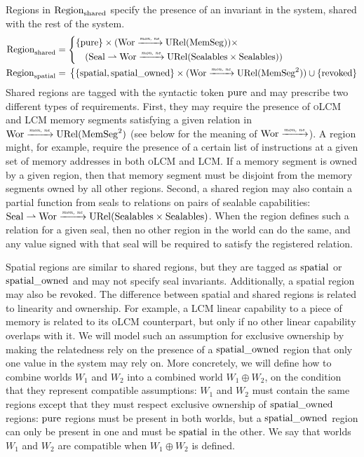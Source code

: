 \documentclass[acmsmall,review,showframe]{acmart}\settopmatter{printfolios=true,printccs=false,printacmref=false}
\renewcommand{\MemSeg}{\shareddom{MemSeg}}
\renewcommand{\SealableCaps}{\shareddom{Sealables}}
\newcommand{\trgcm}{\textsc{LCM}}
\newcommand{\srccm}{\textsc{oLCM}}
\begin{document}
Regions in $\mathrm{Region}_\mathrm{shared}$ specify the presence of an invariant in the system, shared with the rest of the system.
\begin{align*}
  \Regionh &= 
             \left\{\begin{multlined}
               \{\pure \} \times (\Wor \monnefun \URel{\MemSeg}) \times \\
               (\Seal \parfun \Wor \monnefun \URel{\SealableCaps \times \SealableCaps})
             \end{multlined}\right.\\
  \Regions &={}
             \left\{\begin{multlined}
               \{\spatial,\spatialo \} \times (\Wor \monnefun \URel{\MemSeg^2}) \cup{} \{\revoked\}
             \end{multlined}\right.
\end{align*}
Shared regions are tagged with the syntactic token $\mathrm{pure}$ and may prescribe two different types of requirements.
First, they may require the presence of \srccm{} and \trgcm{} memory segments
satisfying a given relation in $\Wor \monnefun \URel{\MemSeg^2}$
(see below for the meaning of $\mathrm{Wor} \xrightarrow{\textit{\tiny{mon, ne}}}$).
A region might, for example, require the presence of a certain list of instructions at a given set of memory addresses in both \srccm{} and \trgcm{}.
If a memory segment is owned by a given region, then that memory segment must be disjoint from the memory segments owned by all other regions.
Second, a shared region may also contain a partial function from seals to relations on pairs of sealable capabilities: $\Seal \parfun \Wor \monnefun \URel{\SealableCaps \times \SealableCaps}$.
When the region defines such a relation for a given seal, then no other region in the world can do the same, and any value signed with that seal will be required to satisfy the registered relation.

Spatial regions are similar to shared regions, but they are tagged as $\mathrm{spatial}$ or $\mathrm{spatial\_owned}$ and may not specify seal invariants.
Additionally, a spatial region may also be $\mathrm{revoked}$.
The difference between spatial and shared regions is related to linearity and ownership.
For example, a \trgcm{} linear capability to a piece of memory is related to its \srccm{} counterpart, but only if no other linear capability overlaps with it.
We will model such an assumption for exclusive ownership by making the relatedness rely on the presence of a $\mathrm{spatial\_owned}$ region that only one value in the system may rely on.
More concretely, we will define how to combine worlds $W_1$ and $W_2$ into a combined world $W_1 \oplus W_2$, on the condition that they represent compatible assumptions: $W_1$ and $W_2$ must contain the same regions except that they must respect exclusive ownership of $\mathrm{spatial\_owned}$ regions: $\mathrm{pure}$ regions must be present in both worlds, but a $\mathrm{spatial\_owned}$ region can only be present in one and must be $\mathrm{spatial}$ in the other.
We say that worlds $W_1$ and $W_2$ are compatible when $W_1 \oplus W_2$ is defined.
\end{document}
